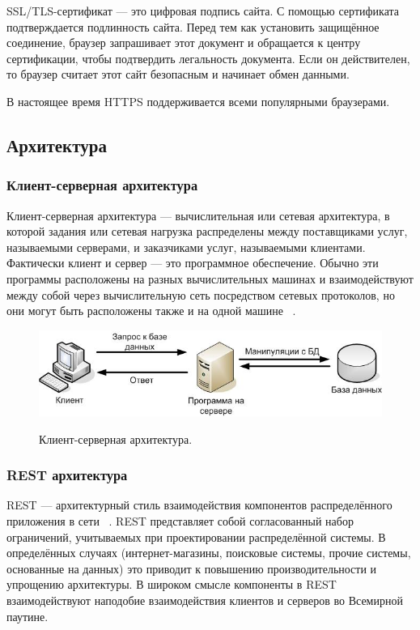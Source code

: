 \documentclass[a4paper,14pt]{extarticle}
\begin{document}
 	SSL/TLS-сертификат — это цифровая подпись сайта. С помощью сертификата подтверждается подлинность сайта. Перед тем как установить защищённое соединение, браузер запрашивает этот документ и обращается к центру сертификации, чтобы подтвердить легальность документа. Если он действителен, то браузер считает этот сайт безопасным и начинает обмен данными.
 	
 	В настоящее время HTTPS поддерживается всеми популярными браузерами.
 	
 	\subsection{Архитектура}
 	
 	\subsubsection{Клиент-серверная архитектура}
 	
 	Клиент-серверная архитектура — вычислительная или сетевая архитектура, в которой задания или сетевая нагрузка распределены между поставщиками услуг, называемыми серверами, и заказчиками услуг, называемыми клиентами. Фактически клиент и сервер — это программное обеспечение. Обычно эти программы расположены на разных вычислительных машинах и взаимодействуют между собой через вычислительную сеть посредством сетевых протоколов, но они могут быть расположены также и на одной машине ~\cite{client-server}.
 	
 	\begin{figure}[h!]
 		\begin{center}
 			{\includegraphics[scale = 0.6]{img/client-server.jpeg}}
 			\label{ris:client-server}
 		\end{center}
 		\caption{Клиент-серверная архитектура.}
 	\end{figure}
 
 	\subsubsection{REST архитектура}
 	
 	REST — архитектурный стиль взаимодействия компонентов распределённого приложения в сети ~\cite{rest}. REST представляет собой согласованный набор ограничений, учитываемых при проектировании распределённой системы. В определённых случаях (интернет-магазины, поисковые системы, прочие системы, основанные на данных) это приводит к повышению производительности и упрощению архитектуры. В широком смысле компоненты в REST взаимодействуют наподобие взаимодействия клиентов и серверов во Всемирной паутине.
 	
\end{document}
